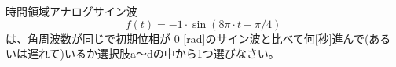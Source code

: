 時間領域アナログサイン波 
\[
f(t) = -1\cdot \sin( 8\pi \cdot t - \pi/4 )
\]
は、角周波数が同じで初期位相が $0$ [rad]のサイン波と比べて何[秒]進んで(あるいは遅れて)いるか選択肢a〜dの中から1つ選びなさい。
